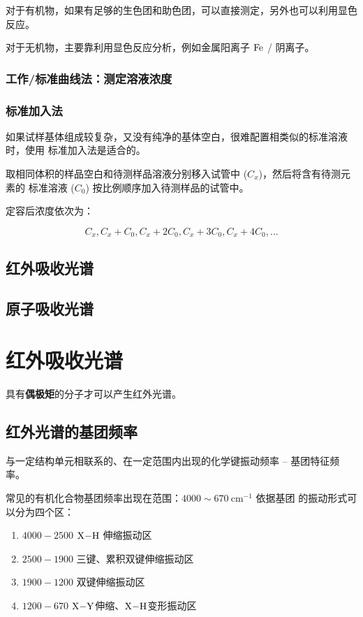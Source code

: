 对于有机物，如果有足够的生色团和助色团，可以直接测定，另外也可以利用显色反应。

对于无机物，主要靠利用显色反应分析，例如金属阳离子 $\ce{Fe}$ / 阴离子。

\subsubsection{工作/标准曲线法：测定溶液浓度}

\subsubsection{标准加入法}

如果试样基体组成较复杂，又没有纯净的基体空白，很难配置相类似的标准溶液时，使用
标准加入法是适合的。

取相同体积的样品空白和待测样品溶液分别移入试管中 ($C_x$)，然后将含有待测元素的
标准溶液 ($C_0$) 按比例顺序加入待测样品的试管中。

定容后浓度依次为：

\begin{equation}
    C_x, C_x + C_0, C_x + 2C_0, C_x + 3C_0, C_x + 4C_0, \dots
\end{equation}

\subsection{红外吸收光谱}

\subsection{原子吸收光谱}

\section{红外吸收光谱}

具有\textbf{偶极矩}的分子才可以产生红外光谱。

\subsection{红外光谱的基团频率}

与一定结构单元相联系的、在一定范围内出现的化学键振动频率 -- 基团特征频率。

常见的有机化合物基团频率出现在范围：$4000 \sim 670 \ \mathrm{cm}^{-1}$ 依据基团
的振动形式可以分为四个区：

\begin{enumerate}
    \item $4000 - 2500$ $\ce{X-H}$ 伸缩振动区
    \item $2500 - 1900$ 三键、累积双键伸缩振动区
    \item $1900 - 1200$ 双键伸缩振动区
    \item $1200 - 670$ $\ce{X-Y}$伸缩、$\ce{X-H}$变形振动区
\end{enumerate}


